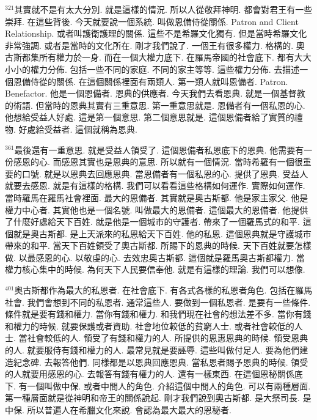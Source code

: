 \documentclass{book}
\begin{document}
$^{321}$其實就不是有太大分別.
就是這樣的情況.
所以人從敬拜神明.
都會對君王有一些崇拜.
在這些背後.
今天就要說一個系統.
叫做恩備侍從關係.
Patron and Client Relationship.
或者叫護衛護理的關係.
這些不是希羅文化獨有.
但是當時希羅文化非常強調.
或者是當時的文化所在.
剛才我們說了.
一個王有很多權力.
格構的.
奧古斯都集所有權力於一身.
而在一個大權力底下.
在羅馬帝國的社會底下.
都有大大小小的權力分佈.
包括一些不同的家庭.
不同的家主等等.
這些權力分佈.
去描述一個恩備侍從的關係.
在這個關係裡面有兩類人.
第一類人就叫恩備者.
Patron.
Benefactor.
他是一個恩備者.
恩典的供應者.
今天我們去看恩典.
就是一個基督教的術語.
但當時的恩典其實有三重意思.
第一重意思就是.
恩備者有一個私恩的心.
他想給受益人好處.
這是第一個意思.
第二個意思就是.
這個恩備者給了實質的禮物.
好處給受益者.
這個就稱為恩典.

$^{361}$最後還有一重意思.
就是受益人領受了.
這個恩備者私恩底下的恩典.
他需要有一份感恩的心.
而感恩其實也是恩典的意思.
所以就有一個情況.
當時希羅有一個很重要的口號.
就是以恩典去回應恩典.
當恩備者有一個私恩的心.
提供了恩典.
受益人就要去感恩.
就是有這樣的格構.
我們可以看看這些格構如何運作.
實際如何運作.
當時羅馬在羅馬社會裡面.
最大的恩備者.
其實就是奧古斯都.
他是家主家父.
他是權力中心者.
其實他也是一個名號.
叫做最大的恩備者.
這個最大的恩備者.
他提供了什麼好處給天下百姓.
就是他是一個城市的守護者.
帶來了一個羅馬式的和平.
這個就是奧古斯都.
是上天派來的私恩給天下百姓.
他的私恩.
這個恩典就是守護城市帶來的和平.
當天下百姓領受了奧古斯都.
所賜下的恩典的時候.
天下百姓就要怎樣做.
以最感恩的心.
以敬虔的心.
去效忠奧古斯都.
這個就是羅馬奧古斯都權力.
當權力核心集中的時候.
為何天下人民要信奉他.
就是有這樣的理論.
我們可以想像.

$^{401}$奧古斯都作為最大的私恩者.
在社會底下.
有各式各樣的私恩者角色.
包括在羅馬社會.
我們會想到不同的私恩者.
通常這些人.
要做到一個私恩者.
是要有一些條件.
條件就是要有錢和權力.
當你有錢和權力.
和我們現在社會的想法差不多.
當你有錢和權力的時候.
就要保護或者資助.
社會地位較低的貧窮人士.
或者社會較低的人士.
當社會較低的人.
領受了有錢和權力的人.
所提供的恩惠恩典的時候.
領受恩典的人.
就要服侍有錢和權力的人.
最常見就是要誣辱.
這些叫做付足人.
要為他們建造紀念碑.
去報答他們.
同樣都是以恩典回應恩典.
當私恩者賜予恩典的時候.
領受的人就要用感恩的心.
去報答有錢有權力的人.
還有一樣東西.
在這個恩秘關係底下.
有一個叫做中保.
或者中間人的角色.
介紹這個中間人的角色.
可以有兩種層面.
第一種層面就是從神明和帝王的關係說起.
剛才我們說到奧古斯都.
是大祭司長.
是中保.
所以普遍人在希臘文化來說.
會認為最大最大的恩秘者.
\end{document}
